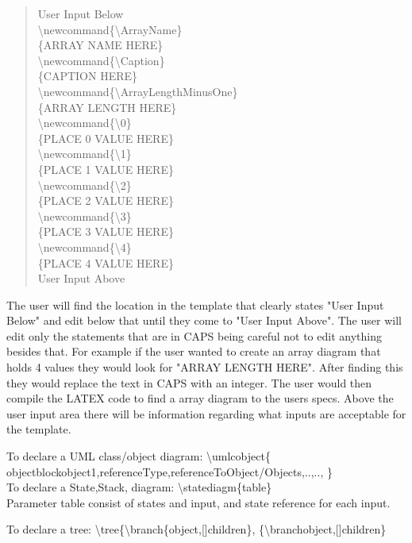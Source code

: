 \documentclass[10pt,a4paper,english]{article}
\begin{document}
\begin{flushleft}
\begin{quote}{\ttfamily \raggedright \noindent
User Input Below~\\
{\textbackslash}newcommand{\{}{\textbackslash}ArrayName{\}}~\\
{\{}ARRAY NAME HERE{\}}~\\
{\textbackslash}newcommand{\{}{\textbackslash}Caption{\}}~\\
{\{}CAPTION HERE{\}}~\\
{\textbackslash}newcommand{\{}{\textbackslash}ArrayLengthMinusOne{\}}~\\
{\{}ARRAY LENGTH HERE{\}}~\\
{\textbackslash}newcommand{\{}{\textbackslash}0{\}}~\\
{\{}PLACE 0 VALUE HERE{\}}~\\
{\textbackslash}newcommand{\{}{\textbackslash}1{\}}~\\
{\{}PLACE 1 VALUE HERE{\}}~\\
{\textbackslash}newcommand{\{}{\textbackslash}2{\}}~\\
{\{}PLACE 2 VALUE HERE{\}}~\\
{\textbackslash}newcommand{\{}{\textbackslash}3{\}}~\\
{\{}PLACE 3 VALUE HERE{\}}~\\
{\textbackslash}newcommand{\{}{\textbackslash}4{\}}~\\
{\{}PLACE 4 VALUE HERE{\}}~\\
User Input Above~\\
}\end{quote}

The user will find the location in the template that clearly states "User Input Below" and edit below that until they come to "User Input Above".  The user will edit only the statements that are in CAPS being careful not to edit anything besides that.  For example if the user wanted to create an array diagram that holds 4 values they would look for "ARRAY LENGTH HERE".  After finding this they would replace the text in CAPS with an integer.  The user would then compile the LATEX code to find a array diagram to the users specs.  Above the user input area there will be information regarding what inputs are acceptable for the template.

To declare a UML class/object diagram:
{\textbackslash}umlcobject{\{}
objectblock{object1,referenceType,referenceToObject/Objects},..,..,
{\}}~ \\

To declare a State,Stack, diagram:
{\textbackslash}statediagm{\{}table{\}}~ \\ 
Parameter table consist of states and input, and state reference for each input.

To declare a tree:
{\textbackslash}tree{\{}{\textbackslash}branch{\{}object,[]children{\}}, {\{}{\textbackslash}branch{object,[]children}{\}}~\\


\end{flushleft}
\end{document}

